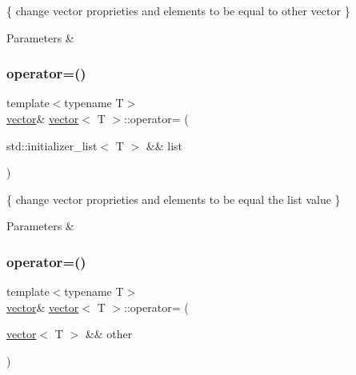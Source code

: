 \{ change vector proprieties and elements to be equal to other vector \} 


\begin{DoxyParams}{Parameters}
{\em } & \\
\hline
\end{DoxyParams}
\mbox{\label{classvector_aa6508b05970549d0b7a343a82aadc081}} 
\subsubsection{\texorpdfstring{operator=()}{operator=()}\hspace{0.1cm}{\footnotesize\ttfamily [2/3]}}
{\footnotesize\ttfamily template$<$typename T$>$ \\
\hyperlink{classvector}{vector}\& \hyperlink{classvector}{vector}$<$ T $>$\+::operator= (\begin{DoxyParamCaption}\item[{std\+::initializer\+\_\+list$<$ T $>$ \&\&}]{list }\end{DoxyParamCaption})\hspace{0.3cm}{\ttfamily [inline]}}



\{ change vector proprieties and elements to be equal the list value \} 


\begin{DoxyParams}{Parameters}
{\em } & \\
\hline
\end{DoxyParams}
\mbox{\label{classvector_aadbb2620429abb0ac75e2baf47b48cfe}} 
\subsubsection{\texorpdfstring{operator=()}{operator=()}\hspace{0.1cm}{\footnotesize\ttfamily [3/3]}}
{\footnotesize\ttfamily template$<$typename T$>$ \\
\hyperlink{classvector}{vector}\& \hyperlink{classvector}{vector}$<$ T $>$\+::operator= (\begin{DoxyParamCaption}\item[{\hyperlink{classvector}{vector}$<$ T $>$ \&\&}]{other }\end{DoxyParamCaption})\hspace{0.3cm}{\ttfamily [inline]}}



